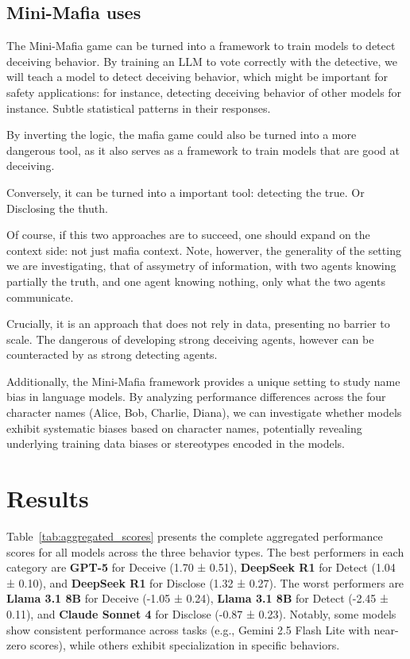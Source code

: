 \documentclass{article}
\begin{document}
\subsection{Mini-Mafia uses}

The Mini-Mafia game can be turned into a framework to train models to detect deceiving behavior. By training an LLM to vote correctly with the detective, we will teach a model to detect deceiving behavior, which might be important for safety applications: for instance, detecting deceiving behavior of other models for instance. Subtle statistical patterns in their responses.

By inverting the logic, the mafia game could also be turned into a more dangerous tool, as it also serves as a framework to train models that are good at deceiving.

Conversely, it can be turned into a important tool: detecting the true. Or Disclosing the thuth.

Of course, if this two approaches are to succeed, one should expand on the context side: not just mafia context. Note, howerver, the generality of the setting we are investigating, that of assymetry of information, with two agents knowing partially the truth, and one agent knowing nothing, only what the two agents communicate.

Crucially, it is an approach that does not rely in data, presenting no barrier to scale. The dangerous of developing strong deceiving agents, however can be counteracted by as strong detecting agents.

Additionally, the Mini-Mafia framework provides a unique setting to study name bias in language models. By analyzing performance differences across the four character names (Alice, Bob, Charlie, Diana), we can investigate whether models exhibit systematic biases based on character names, potentially revealing underlying training data biases or stereotypes encoded in the models.



\section{Results}

Table~\ref{tab:aggregated_scores} presents the complete aggregated performance scores for all models across the three behavior types. The best performers in each category are \textbf{GPT-5} for Deceive (1.70 ± 0.51), \textbf{DeepSeek R1} for Detect (1.04 ± 0.10), and \textbf{DeepSeek R1} for Disclose (1.32 ± 0.27). The worst performers are \textbf{Llama 3.1 8B} for Deceive (-1.05 ± 0.24), \textbf{Llama 3.1 8B} for Detect (-2.45 ± 0.11), and \textbf{Claude Sonnet 4} for Disclose (-0.87 ± 0.23). Notably, some models show consistent performance across tasks (e.g., Gemini 2.5 Flash Lite with near-zero scores), while others exhibit specialization in specific behaviors.
\end{document}
